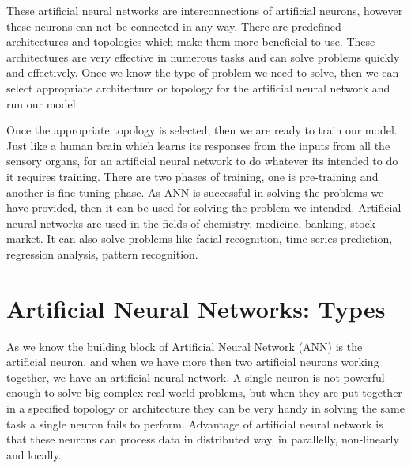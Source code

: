 \documentclass[12pt, a4paper]{report}
\begin{document}
These artificial neural networks are interconnections of artificial neurons, however these neurons can not be connected in any way. There are predefined architectures and topologies which make them more beneficial to use. These architectures are very effective in numerous tasks and can solve problems quickly and effectively. Once we know the type of problem we need to solve, then we can select appropriate  architecture or topology for the artificial neural network and run our model.\\ \par

Once the appropriate topology is selected, then we are ready to train our model. Just like a human brain which learns its responses from the inputs  from all the sensory organs, for an artificial neural network to do whatever its intended to do it requires training. There are two phases of training, one is pre-training and another is fine tuning phase. As ANN is successful in solving the problems we have provided, then it can be used for solving the problem we intended. Artificial neural networks are used in the fields of chemistry, medicine, banking, stock market. It can also solve problems like facial recognition, time-series prediction, regression analysis, pattern recognition.


\section{Artificial Neural Networks: Types}

As we know the building block of Artificial Neural Network (ANN) is the artificial neuron, and when we have more then two artificial neurons working together, we have an artificial neural network. A single neuron is not powerful enough to solve big complex real world problems, but when they are put together in a specified topology or architecture they can be very handy in solving the same task a single neuron fails to perform. Advantage of artificial neural network is that these neurons can process data in distributed way, in parallelly, non-linearly and locally. \\\par
\end{document}
